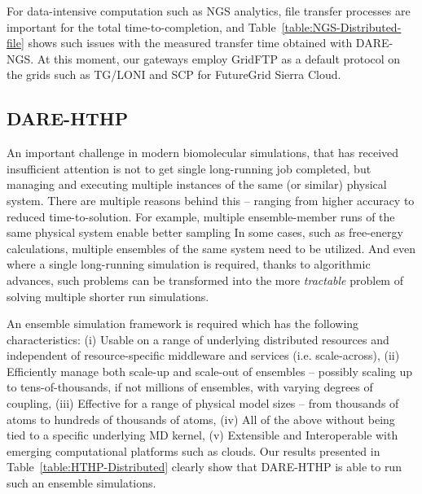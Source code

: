 \documentclass[]{article}
\begin{document}
For data-intensive computation such as NGS analytics, file transfer
processes are important for the total time-to-completion, and
Table~\ref{table:NGS-Distributed-file} shows such issues with the
measured transfer time obtained with DARE-NGS.  At this moment, our
gateways employ GridFTP as a default protocol on the grids such as
TG/LONI and SCP for FutureGrid Sierra Cloud.



\subsection{DARE-HTHP}

An important challenge in modern biomolecular simulations, that has
received insufficient attention is not to get single long-running job
completed, but managing and executing multiple instances of the same
(or similar) physical system.  There are multiple reasons behind this
-- ranging from higher accuracy to reduced time-to-solution. For
example, multiple ensemble-member runs of the same physical system
enable better sampling In some cases, such as free-energy
calculations, multiple ensembles of the same system need to be
utilized. And even where a single long-running simulation is required,
thanks to algorithmic advances, such problems can be transformed into
the more {\it tractable} problem of solving multiple shorter run
simulations.



An ensemble simulation framework is required which has the following
characteristics: (i) Usable on a range of underlying distributed
resources and independent of resource-specific
middleware and services (i.e. scale-across), (ii) Efficiently manage
both scale-up and scale-out of ensembles -- possibly scaling up to
tens-of-thousands, if not millions of ensembles, with varying degrees
of coupling, (iii) Effective for a range of physical model sizes --
from thousands of atoms to hundreds of thousands of atoms, (iv) All of
the above without being tied to a specific underlying MD kernel, (v)
Extensible and Interoperable with emerging computational platforms
such as clouds.  Our results presented in
Table~\ref{table:HTHP-Distributed} clearly show that DARE-HTHP is able
to run such an ensemble simulations.


\end{document}

